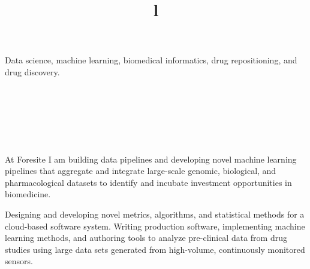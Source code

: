 \begin{resume}



\section{}
Data science, machine learning, biomedical informatics, drug repositioning, and drug discovery.


\section{}
\begin{format}
  \\
  \title{l}\\
  \body\\
\end{format}


\title{\small{}}
\begin{position}
At Foresite I am building data pipelines and developing novel machine learning pipelines that aggregate and integrate large-scale genomic, biological, and pharmacological datasets to identify and incubate investment opportunities in biomedicine.
\end{position}

\vspace{-0.5em}

\title{\small{}}
\begin{position}
Designing and developing novel metrics, algorithms, and statistical methods for a cloud-based software system.  Writing production software, implementing machine learning methods, and authoring tools to analyze pre-clinical data from drug studies using large data sets generated from high-volume, continuously monitored sensors.
\end{position}


\end{resume}

